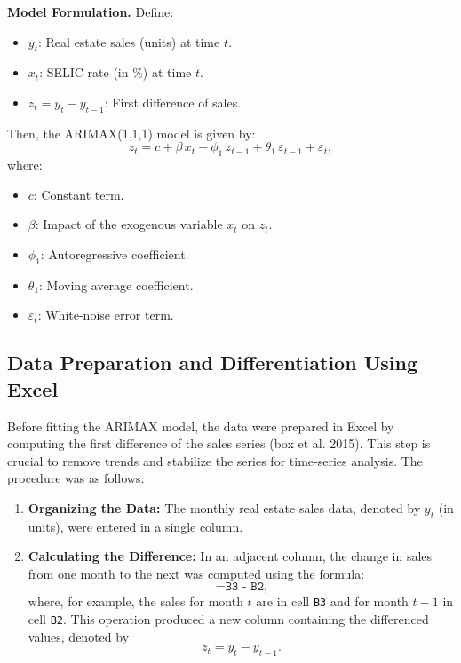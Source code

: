 \documentclass[10pt]{article}
\begin{document}
\textbf{Model Formulation.}  
Define:
\begin{itemize}
    \item \(y_t\): Real estate sales (units) at time \(t\).
    \item \(x_t\): SELIC rate (in \%) at time \(t\).
    \item \(z_t = y_t - y_{t-1}\): First difference of sales.
\end{itemize}
Then, the ARIMAX(1,1,1) model is given by:
\begin{equation}
z_t = c + \beta\,x_t + \phi_1\,z_{t-1} + \theta_1\,\varepsilon_{t-1} + \varepsilon_t,
\end{equation}
where:
\begin{itemize}
    \item \(c\): Constant term.
    \item \(\beta\): Impact of the exogenous variable \(x_t\) on \(z_t\).
    \item \(\phi_1\): Autoregressive coefficient.
    \item \(\theta_1\): Moving average coefficient.
    \item \(\varepsilon_t\): White-noise error term.
\end{itemize}


\subsection{Data Preparation and Differentiation Using Excel}
Before fitting the ARIMAX model, the data were prepared in Excel by computing the first difference of the sales series (box et al. 2015). This step is crucial to remove trends and stabilize the series for time‐series analysis. The procedure was as follows:
\begin{enumerate}
    \item \textbf{Organizing the Data:} The monthly real estate sales data, denoted by \(y_t\) (in units), were entered in a single column.
    \item \textbf{Calculating the Difference:} In an adjacent column, the change in sales from one month to the next was computed using the formula:
    \[
    \texttt{=B3 - B2,}
    \]
    where, for example, the sales for month \(t\) are in cell \texttt{B3} and for month \(t-1\) in cell \texttt{B2}. This operation produced a new column containing the differenced values, denoted by
    \begin{equation}
    z_t = y_t - y_{t-1}.
    \end{equation}
\end{enumerate}
\end{document}
